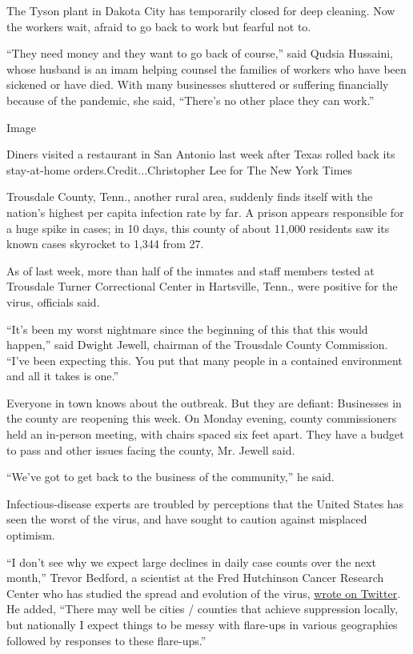 The Tyson plant in Dakota City has temporarily closed for deep cleaning.
Now the workers wait, afraid to go back to work but fearful not to.

``They need money and they want to go back of course,'' said Qudsia
Hussaini, whose husband is an imam helping counsel the families of
workers who have been sickened or have died. With many businesses
shuttered or suffering financially because of the pandemic, she said,
``There's no other place they can work.''

Image

Diners visited a restaurant in San Antonio last week after Texas rolled
back its stay-at-home orders.Credit...Christopher Lee for The New York
Times

Trousdale County, Tenn., another rural area, suddenly finds itself with
the nation's highest per capita infection rate by far. A prison appears
responsible for a huge spike in cases; in 10 days, this county of about
11,000 residents saw its known cases skyrocket to 1,344 from 27.

As of last week, more than half of the inmates and staff members tested
at Trousdale Turner Correctional Center in Hartsville, Tenn., were
positive for the virus, officials said.

``It's been my worst nightmare since the beginning of this that this
would happen,'' said Dwight Jewell, chairman of the Trousdale County
Commission. ``I've been expecting this. You put that many people in a
contained environment and all it takes is one.''

Everyone in town knows about the outbreak. But they are defiant:
Businesses in the county are reopening this week. On Monday evening,
county commissioners held an in-person meeting, with chairs spaced six
feet apart. They have a budget to pass and other issues facing the
county, Mr. Jewell said.

``We've got to get back to the business of the community,'' he said.

Infectious-disease experts are troubled by perceptions that the United
States has seen the worst of the virus, and have sought to caution
against misplaced optimism.

``I don't see why we expect large declines in daily case counts over the
next month,'' Trevor Bedford, a scientist at the Fred Hutchinson Cancer
Research Center who has studied the spread and evolution of the virus,
\href{https://twitter.com/trvrb/status/1255976683770806272}{wrote on
Twitter}. He added, ``There may well be cities / counties that achieve
suppression locally, but nationally I expect things to be messy with
flare-ups in various geographies followed by responses to these
flare-ups.''

